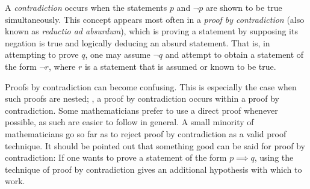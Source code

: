 \documentclass[12pt]{article}
\begin{document}
A \emph{contradiction} occurs when the statements $p$ and $\neg p$ are shown to be true simultaneously.  This concept appears most often in a \emph{proof by contradiction} (also known as \emph{reductio ad absurdum}), which is proving a statement by supposing its negation is true and logically deducing an absurd statement.  That is, in attempting to prove $q$, one may assume $\neg q$ and attempt to obtain a statement of the form $\neg r$, where $r$ is a statement that is assumed or known to be true.

Proofs by contradiction can become confusing.  This is especially the case when such proofs are nested; , a proof by contradiction occurs within a proof by contradiction.  Some mathematicians prefer to use a direct proof whenever possible, as such  are easier to follow in general.  A small minority of mathematicians go so far as to reject proof by contradiction as a valid proof technique.  It should be pointed out that something good can be said for proof by contradiction:  If one wants to prove a statement of the form $p \implies q$, using the technique of proof by contradiction gives an additional hypothesis with which to work.
\end{document}

